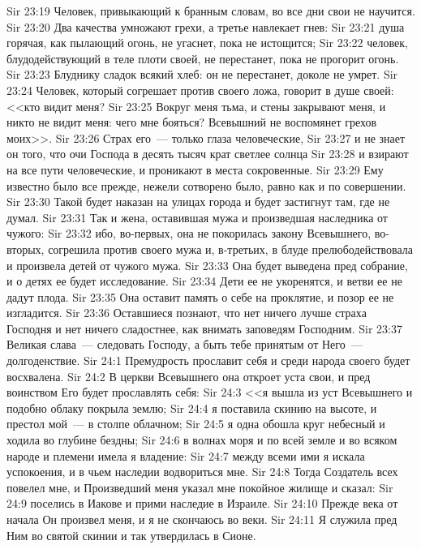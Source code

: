 \vs Sir 23:19 Человек, привыкающий к бранным словам, во все дни свои не научится.
\vs Sir 23:20 Два качества умножают грехи, а третье навлекает гнев:
\vs Sir 23:21 душа горячая, как пылающий огонь, не угаснет, пока не истощится;
\vs Sir 23:22 человек, блудодействующий в теле плоти своей, не перестанет, пока не прогорит огонь.
\vs Sir 23:23 Блуднику сладок всякий хлеб: он не перестанет, доколе не умрет.
\vs Sir 23:24 Человек, который согрешает против своего ложа, говорит в душе своей: <<кто видит меня?
\vs Sir 23:25 Вокруг меня тьма, и стены закрывают меня, и никто не видит меня: чего мне бояться? Всевышний не воспомянет грехов моих>>.
\vs Sir 23:26 Страх его~--- только глаза человеческие,
\vs Sir 23:27 и не знает он того, что очи Господа в десять тысяч крат светлее солнца
\vs Sir 23:28 и взирают на все пути человеческие, и проникают в места сокровенные.
\vs Sir 23:29 Ему известно было все прежде, нежели сотворено было, равно как и по совершении.
\vs Sir 23:30 Такой  будет наказан на улицах города и будет застигнут там, где не думал.
\vs Sir 23:31 Так и жена, оставившая мужа и произведшая наследника от чужого:
\vs Sir 23:32 ибо, во-первых, она не покорилась закону Всевышнего, во-вторых, согрешила против своего мужа и, в-третьих, в блуде прелюбодействовала и произвела детей от чужого мужа.
\vs Sir 23:33 Она будет выведена пред собрание, и о детях ее будет исследование.
\vs Sir 23:34 Дети ее не укоренятся, и ветви ее не дадут плода.
\vs Sir 23:35 Она оставит память о себе на проклятие, и позор ее не изгладится.
\vs Sir 23:36 Оставшиеся познают, что нет ничего лучше страха Господня и нет ничего сладостнее, как внимать заповедям Господним.
\vs Sir 23:37 Великая слава~--- следовать Господу, а быть тебе принятым от Него~--- долгоденствие.
\vs Sir 24:1 Премудрость прославит себя и среди народа своего будет восхвалена.
\vs Sir 24:2 В церкви Всевышнего она откроет уста свои, и пред воинством Его будет прославлять себя:
\vs Sir 24:3 <<я вышла из уст Всевышнего и подобно облаку покрыла землю;
\vs Sir 24:4 я поставила скинию на высоте, и престол мой~--- в столпе облачном;
\vs Sir 24:5 я одна обошла круг небесный и ходила во глубине бездны;
\vs Sir 24:6 в волнах моря и по всей земле и во всяком народе и племени имела я владение:
\vs Sir 24:7 между всеми ими я искала успокоения, и в чьем наследии водвориться мне.
\vs Sir 24:8 Тогда Создатель всех повелел мне, и Произведший меня указал мне покойное жилище и сказал:
\vs Sir 24:9 поселись в Иакове и прими наследие в Израиле.
\vs Sir 24:10 Прежде века от начала Он произвел меня, и я не скончаюсь во веки.
\vs Sir 24:11 Я служила пред Ним во святой скинии и так утвердилась в Сионе.

